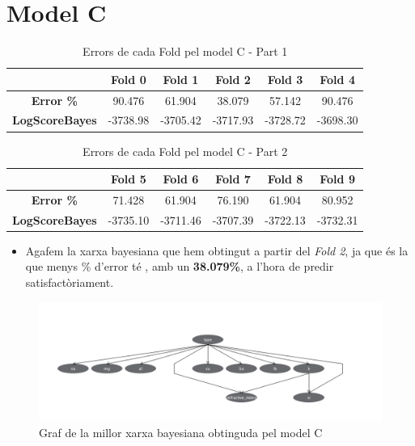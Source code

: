 \documentclass[11pt,a4paper]{article}
\begin{document}
\newpage

\section{Model C}
\vspace*{0.5in}

\begin{table}[htbp]
\center
\begin{tabular}{|c||c|c|c|c|c|}
\hline
 & Fold 0 & Fold 1 & Fold 2 & Fold 3 & Fold 4 \\
\hline \hline
\textbf{Error \%}
 & 90.476 & 61.904 & 38.079 & 57.142 & 90.476\\
\hline
\textbf{LogScoreBayes} 
 & -3738.98 & -3705.42 & -3717.93 & -3728.72 & -3698.30  \\
\hline
\end{tabular}
\caption{Errors de cada Fold pel model C - Part 1}
\end{table}

\vspace*{0.5in}

\begin{table}[htbp]
\center
\begin{tabular}{|c||c|c|c|c|c|}
\hline
 & Fold 5 & Fold 6 & Fold 7 & Fold 8 & Fold 9 \\
\hline \hline
\textbf{Error \%}
 & 71.428 & 61.904 & 76.190 & 61.904 & 80.952\\
\hline
\textbf{LogScoreBayes} 
 & -3735.10 & -3711.46 & -3707.39 & -3722.13 & -3732.31 \\
\hline
\end{tabular}
\caption{Errors de cada Fold pel model C - Part 2}
\end{table}

\vspace*{0.5in}
\begin{itemize}
\item Agafem la xarxa bayesiana que hem obtingut a partir del \textit{Fold 2}, ja que és la que menys \% d'error té , amb un \textbf{38.079\%}, a l'hora de predir satisfactòriament.
\end{itemize}
\begin{figure}[hbtp]
\centering
\includegraphics[scale=0.5]{Figures/r5.png}
\caption{Graf de la millor xarxa bayesiana obtinguda pel model C}
\end{figure}
\end{document}
